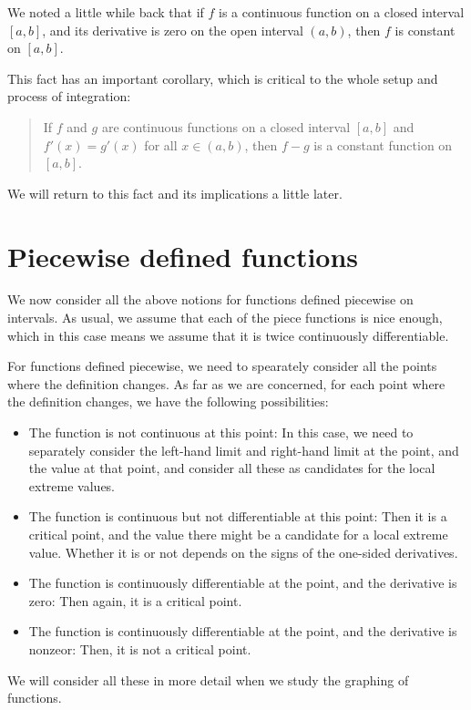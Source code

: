 \documentclass{amsart}
\begin{document}
We noted a little while back that if $f$ is a continuous function on a
closed interval $[a,b]$, and its derivative is zero on the open
interval $(a,b)$, then $f$ is constant on $[a,b]$.

This fact has an important corollary, which is critical to the whole
setup and process of integration:

\begin{quote}
  If $f$ and $g$ are continuous functions on a closed interval $[a,b]$
  and $f'(x) = g'(x)$ for all $x \in (a,b)$, then $f - g$ is a
  constant function on $[a,b]$.
\end{quote}

We will return to this fact and its implications a little later.

\section{Piecewise defined functions}

We now consider all the above notions for functions defined piecewise
on intervals. As usual, we assume that each of the piece functions is
nice enough, which in this case means we assume that it is twice
continuously differentiable.

For functions defined piecewise, we need to spearately consider all
the points where the definition changes. As far as we are concerned,
for each point where the definition changes, we have the following
possibilities:

\begin{itemize}
\item The function is not continuous at this point: In this case, we
  need to separately consider the left-hand limit and right-hand limit
  at the point, and the value at that point, and consider all these as
  candidates for the local extreme values.
\item The function is continuous but not differentiable at this point:
  Then it is a critical point, and the value there might be a
  candidate for a local extreme value. Whether it is or not depends on
  the signs of the one-sided derivatives.
\item The function is continuously differentiable at the point, and
  the derivative is zero: Then again, it is a critical point.
\item The function is continuously differentiable at the point, and
  the derivative is nonzeor: Then, it is not a critical point.
\end{itemize}

We will consider all these in more detail when we study the graphing
of functions.
\end{document}
